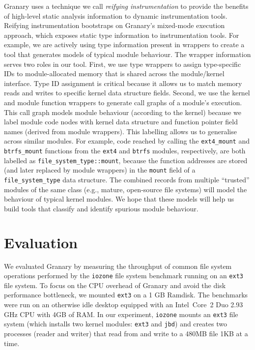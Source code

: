\documentclass[preprint]{sigplanconf}
\begin{document}
Granary uses a technique we call \emph{reifying instrumentation} to provide the benefits of high-level static analysis information to dynamic instrumentation tools. Reifying instrumentation bootstraps on Granary's mixed-mode execution approach, which exposes static type information to instrumentation tools. For example, we are actively using type information present in wrappers to create a tool that generates models of typical module behaviour. The wrapper information serves two roles in our tool. First, we use type wrappers to assign type-specific IDs to module-allocated memory that is shared across the module/kernel interface. Type ID assignment is critical because it allows us to match memory reads and writes to specific kernel data structure fields. Second, we use the kernel and module function wrappers to generate call graphs of a module's execution. This call graph models module behaviour (according to the kernel) because we label module code nodes with kernel data structure and function pointer field names (derived from module wrappers). This labelling allows us to generalise across similar modules. For example, code reached by calling the \texttt{ext4\_mount} and \texttt{btrfs\_mount} functions from the \texttt{ext4} and \texttt{btrfs} modules, respectively, are both labelled as \texttt{file\_system\_type::mount}, because the function addresses are stored (and later replaced by module wrappers) in the \texttt{mount} field of a \texttt{file\_system\_type} data structure. The combined records from multiple ``trusted'' modules of the same class (e.g., mature, open-source file systems) will model the behaviour of typical kernel modules. We hope that these models will help us build tools that classify and identify spurious module behaviour. 

\section{Evaluation}\label{sec:eval}

We evaluated Granary by measuring the throughput of common file system operations performed by the \texttt{iozone} file system benchmark running on an \texttt{ext3} file system.
To focus on the CPU overhead of Granary and avoid the disk performance bottleneck, we mounted \texttt{ext3} on a 1 GB Ramdisk.  The benchmarks were run on an otherwise idle desktop equipped with an Intel\textregistered\ Core\texttrademark\ 2 Duo 2.93 GHz CPU with 4GB of RAM.  In our experiment, \texttt{iozone} mounts an \texttt{ext3} file system (which installs two kernel modules: \texttt{ext3} and \texttt{jbd}) and creates two processes (reader and writer) that read from and write to a 480MB file 1KB at a time. 
\end{document}
